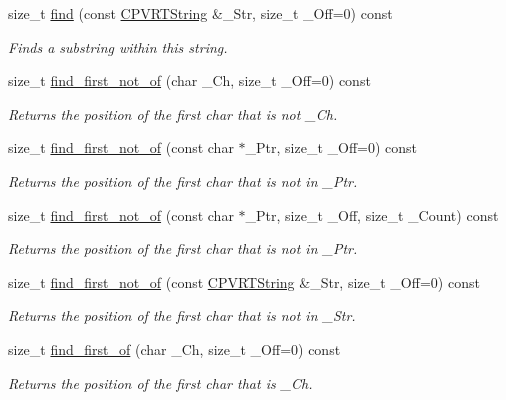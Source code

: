 \begin{DoxyCompactItemize}
size\+\_\+t \hyperlink{class_c_p_v_r_t_string_a39beb7375cd4ec6ecbb6201ed62722c1}{find} (const \hyperlink{class_c_p_v_r_t_string}{C\+P\+V\+R\+T\+String} \&\+\_\+\+Str, size\+\_\+t \+\_\+\+Off=0) const 
\begin{DoxyCompactList}\small\item\em Finds a substring within this string. \end{DoxyCompactList}\item 
size\+\_\+t \hyperlink{class_c_p_v_r_t_string_a0dde9334b700611fadc237bb2e5731bb}{find\+\_\+first\+\_\+not\+\_\+of} (char \+\_\+\+Ch, size\+\_\+t \+\_\+\+Off=0) const 
\begin{DoxyCompactList}\small\item\em Returns the position of the first char that is not \+\_\+\+Ch. \end{DoxyCompactList}\item 
size\+\_\+t \hyperlink{class_c_p_v_r_t_string_a586c82d71a7f2dfbb999b329c31b0b79}{find\+\_\+first\+\_\+not\+\_\+of} (const char $\ast$\+\_\+\+Ptr, size\+\_\+t \+\_\+\+Off=0) const 
\begin{DoxyCompactList}\small\item\em Returns the position of the first char that is not in \+\_\+\+Ptr. \end{DoxyCompactList}\item 
size\+\_\+t \hyperlink{class_c_p_v_r_t_string_a9bb180af88db34e40588237e453c7399}{find\+\_\+first\+\_\+not\+\_\+of} (const char $\ast$\+\_\+\+Ptr, size\+\_\+t \+\_\+\+Off, size\+\_\+t \+\_\+\+Count) const 
\begin{DoxyCompactList}\small\item\em Returns the position of the first char that is not in \+\_\+\+Ptr. \end{DoxyCompactList}\item 
size\+\_\+t \hyperlink{class_c_p_v_r_t_string_a9b2ee6a98e0ae4d21c281da568b840b5}{find\+\_\+first\+\_\+not\+\_\+of} (const \hyperlink{class_c_p_v_r_t_string}{C\+P\+V\+R\+T\+String} \&\+\_\+\+Str, size\+\_\+t \+\_\+\+Off=0) const 
\begin{DoxyCompactList}\small\item\em Returns the position of the first char that is not in \+\_\+\+Str. \end{DoxyCompactList}\item 
size\+\_\+t \hyperlink{class_c_p_v_r_t_string_a3ea029ce35650c19579a85dedcc267e7}{find\+\_\+first\+\_\+of} (char \+\_\+\+Ch, size\+\_\+t \+\_\+\+Off=0) const 
\begin{DoxyCompactList}\small\item\em Returns the position of the first char that is \+\_\+\+Ch. \end{DoxyCompactList}\item 

\end{DoxyCompactItemize}
